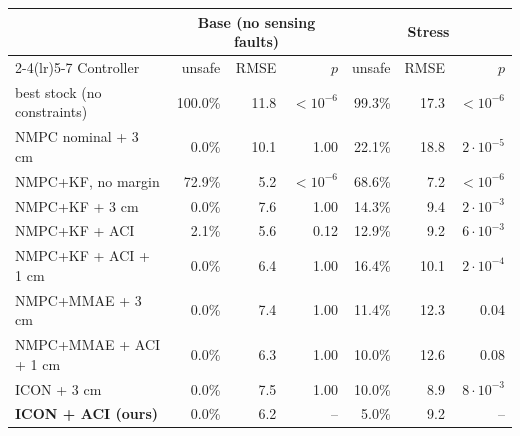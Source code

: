 \begin{tabular}{l rrr rrr}
\toprule
 & \multicolumn{3}{c}{Base (no sensing faults)} & \multicolumn{3}{c}{Stress} \\
\cmidrule(lr){2-4}\cmidrule(lr){5-7}
Controller & unsafe & RMSE & $p$ & unsafe & RMSE & $p$ \\
\midrule
best stock (no constraints) & 100.0\% & 11.8 & $<\!10^{-6}$ & 99.3\% & 17.3 & $<\!10^{-6}$ \\
NMPC nominal + 3 cm & 0.0\% & 10.1 & 1.00 & 22.1\% & 18.8 & $2\!\cdot\!10^{-5}$ \\
NMPC+KF, no margin & 72.9\% & 5.2 & $<\!10^{-6}$ & 68.6\% & 7.2 & $<\!10^{-6}$ \\
NMPC+KF + 3 cm & 0.0\% & 7.6 & 1.00 & 14.3\% & 9.4 & $2\!\cdot\!10^{-3}$ \\
NMPC+KF + ACI & 2.1\% & 5.6 & 0.12 & 12.9\% & 9.2 & $6\!\cdot\!10^{-3}$ \\
NMPC+KF + ACI + 1 cm & 0.0\% & 6.4 & 1.00 & 16.4\% & 10.1 & $2\!\cdot\!10^{-4}$ \\
NMPC+MMAE + 3 cm & 0.0\% & 7.4 & 1.00 & 11.4\% & 12.3 & 0.04 \\
NMPC+MMAE + ACI + 1 cm & 0.0\% & 6.3 & 1.00 & 10.0\% & 12.6 & 0.08 \\
ICON + 3 cm & 0.0\% & 7.5 & 1.00 & 10.0\% & 8.9 & $8\!\cdot\!10^{-3}$ \\
\textbf{ICON + ACI (ours)} & 0.0\% & 6.2 & -- & 5.0\% & 9.2 & -- \\
\bottomrule
\end{tabular}
